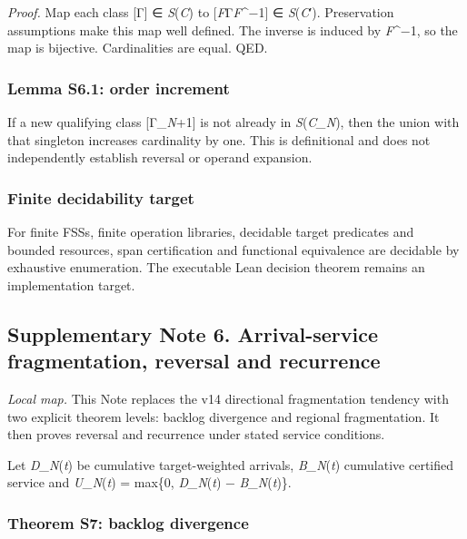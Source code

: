 \emph{Proof.} Map each class {[}Γ{]} ∈ \emph{S}(\emph{C}) to
{[}\emph{F}Γ\emph{F}\^{}−1{]} ∈ \emph{S}(\emph{C}′). Preservation
assumptions make this map well defined. The inverse is induced by
\emph{F}\^{}−1, so the map is bijective. Cardinalities are equal. QED.

\hypertarget{lemma-s6.1-order-increment}{%
\subsubsection{Lemma S6.1: order
increment}\label{lemma-s6.1-order-increment}}

If a new qualifying class {[}Γ\_\emph{N}+1{]} is not already in
\emph{S}(\emph{C\_N}), then the union with that singleton increases
cardinality by one. This is definitional and does not independently
establish reversal or operand expansion.

\hypertarget{finite-decidability-target}{%
\subsubsection{Finite decidability
target}\label{finite-decidability-target}}

For finite FSSs, finite operation libraries, decidable target predicates
and bounded resources, span certification and functional equivalence are
decidable by exhaustive enumeration. The executable Lean decision
theorem remains an implementation target.

\hypertarget{supplementary-note-6.-arrival-service-fragmentation-reversal-and-recurrence}{%
\subsection{Supplementary Note 6. Arrival-service fragmentation,
reversal and
recurrence}\label{supplementary-note-6.-arrival-service-fragmentation-reversal-and-recurrence}}

\emph{Local map.} This Note replaces the v14 directional fragmentation
tendency with two explicit theorem levels: backlog divergence and
regional fragmentation. It then proves reversal and recurrence under
stated service conditions.

Let \emph{D\_N}(\emph{t}) be cumulative target-weighted arrivals,
\emph{B\_N}(\emph{t}) cumulative certified service and
\emph{U\_N}(\emph{t}) = max\{0, \emph{D\_N}(\emph{t}) −
\emph{B\_N}(\emph{t})\}.

\hypertarget{theorem-s7-backlog-divergence}{%
\subsubsection{Theorem S7: backlog
divergence}\label{theorem-s7-backlog-divergence}}

